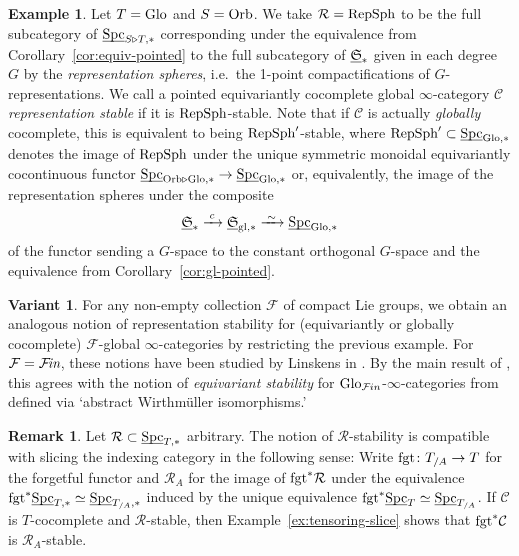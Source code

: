 \documentclass[reqno]{memo-l}
\theoremstyle{mythm}
\theoremstyle{definition}
\newtheorem{rk}[thm]{Remark}
\newtheorem{ex}[thm]{Example}
\newtheorem{variant}[thm]{Variant}
\numberwithin{equation}{section}
\newcommand{\Cc}{{\mathcal{C}}}
\newcommand{\Ff}{{\mathcal{F}}}
\newcommand{\Rr}{{\mathcal R}}
\newcommand{\gl}{\textup{gl}}
\DeclareMathOperator{\Spc}{Spc}
\newcommand{\consto}{\ensuremath{c}}
\newcommand{\fgt}{\textup{fgt}}
\newcommand{\Fin}{\hbox{$\mathcal F\kern-1.7pt\textit{in}$}}
\newcommand{\Orb}{{\vphantom{\textup{t}}\smash{\textup{Orb}}}}
\newcommand{\Glo}{\textup{Glo}}
\newcommand{\ulhelper}[2]{\underline{\setbox0=\hbox{$#1#2$}\dp0=0.4pt \box0\relax}}
\newcommand{\ul}[1]{{\mathpalette\ulhelper{#1}}\hbox{\rule[-2pt]{0pt}{0pt}}}
\newcommand{\iso}{\xrightarrow{\;\smash{\raisebox{-0.25ex}{\ensuremath{\scriptstyle\sim}}}\;}}
\newcommand{\myS}{{{\mathfrak S\kern-.4pt}}}
\begin{document}
\begin{ex}
    Let $T=\Glo$ and $S=\Orb$. We take $\Rr=\textup{RepSph}$ to be the full subcategory of $\ul\Spc_{S\triangleright T,*}$ corresponding under the equivalence from Corollary~\ref{cor:equiv-pointed} to the full subcategory of $\ul\myS_*$ given in each degree $G$ by the \emph{representation spheres}, i.e.\ the 1-point compactifications of $G$-representations. We call a pointed equivariantly cocomplete global $\infty$-category $\Cc$ \emph{representation stable} if it is $\textup{RepSph}$-stable. Note that if $\Cc$ is actually \emph{globally} cocomplete, this is equivalent to being $\textup{RepSph}'$-stable, where $\textup{RepSph}'\subset\ul\Spc_{\Glo,*}$ denotes the image of $\textup{RepSph}$ under the unique symmetric monoidal equivariantly cocontinuous functor $\ul\Spc_{\Orb\triangleright\Glo,*}\to\ul\Spc_{\Glo,*}$ or, equivalently, the image of the representation spheres under the composite
    \[
        \ul\myS_*\xrightarrow{\;\consto\;}\ul\myS_{\gl,*}\iso\ul\Spc_{\Glo,*}
    \]
    of the functor sending a $G$-space to the constant orthogonal $G$-space and the equivalence from Corollary~\ref{cor:gl-pointed}.
\end{ex}

\begin{variant}
    For any non-empty collection $\Ff$ of compact Lie groups, we obtain an analogous notion of representation stability for (equivariantly or globally cocomplete) $\Ff$-global $\infty$-categories by restricting the previous example.
    For $\Ff=\Fin$, these notions have been studied by Linskens in \cite{Linskens2023globalization}. By the main result of \cite{kaif-sil-excisive}, this agrees with the notion of \emph{equivariant stability} for $\Glo_{\Ff\kern-.5pt in}$-$\infty$-categories from \cites{CLL_Global,CLL_Clefts} defined via `abstract Wirthmüller isomorphisms.'
\end{variant}

\begin{rk}
    Let $\Rr\subset\ul\Spc_{T,*}$ arbitrary. The notion of $\Rr$-stability is compatible with slicing the indexing category in the following sense: Write $\fgt\colon T_{/A}\to T$ for the forgetful functor and $\Rr_A$ for the image of $\fgt^*\Rr$ under the equivalence $\fgt^*\ul\Spc_{T,*}\simeq\ul\Spc_{T_{/A},*}$ induced by the unique equivalence $\fgt^*\ul\Spc_T\simeq\ul\Spc_{T_{/A}}$. If $\Cc$ is $T$-cocomplete and $\Rr$-stable, then Example~\ref{ex:tensoring-slice} shows that $\fgt^*\Cc$ is $\Rr_A$-stable.
\end{rk}
\end{document}
